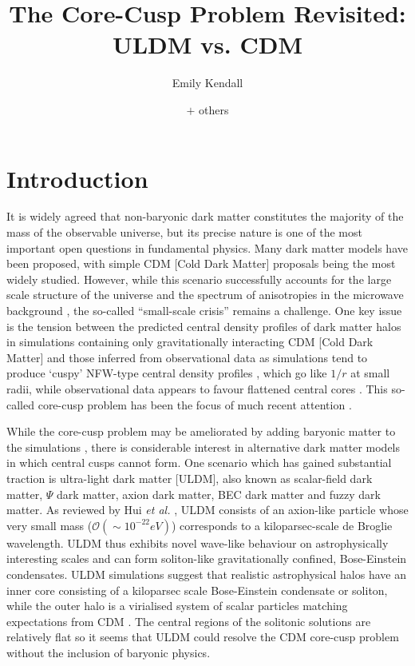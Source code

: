\documentclass[a4paper,11pt]{article}
\title{\boldmath The Core-Cusp Problem Revisited: ULDM vs. CDM}
\author[1]{Emily Kendall}
\author[1]{$+$ others}
\affiliation[1]{Department of Physics, University of Auckland, Private Bag 92019, Auckland, New Zealand}
\begin{document}
\maketitle
\flushbottom


\section{Introduction}\label{sec:intro}

It is widely agreed that non-baryonic dark matter constitutes the majority of the mass of the observable universe, but its precise nature is one of the most important open questions in fundamental physics. Many dark matter models have been proposed, with simple CDM [Cold Dark Matter] proposals being the most widely studied. However, while this scenario successfully accounts for the large scale structure of the universe \cite{Springel:2005nw} and the spectrum of anisotropies in the microwave background \cite{deBernardis:2000sbo, Hanany:2000qf, Halverson:2001yy, Netterfield:2001yq, Lee:2001yp, Ade:2015xua,  Hu:2001bc}, the so-called ``small-scale crisis'' \cite{Weinberg:2013aya} remains a challenge. One key issue is the tension between the predicted central density profiles of dark matter halos in simulations containing only gravitationally interacting CDM [Cold Dark Matter] and those inferred from observational data as simulations tend to produce `cuspy' NFW-type central density profiles \cite{Navarro:1995iw}, which go like $1/r$ at small radii, while observational data appears to favour flattened central cores \cite{Moore:1994yx} . This so-called core-cusp problem has been the focus of much recent attention \cite{Dutton:2018nop, Read:2018pft, Genina:2018}. 

While the core-cusp problem may be ameliorated by adding baryonic matter to the simulations  \cite{Benitez-Llambay:2018}, there is considerable interest in alternative dark matter models in which central cusps cannot form.  One scenario which has gained substantial traction is ultra-light dark matter [ULDM], also known as scalar-field dark matter, $\Psi$ dark matter, axion dark matter, BEC dark matter and fuzzy dark matter. As reviewed by Hui {\em et al.\/} \cite{Hui:2016ltb}, ULDM consists of an axion-like particle whose very small mass  ($\mathcal{O}(\sim 10^{-22}eV)$) corresponds to a kiloparsec-scale de Broglie wavelength.  ULDM thus exhibits novel wave-like behaviour on astrophysically interesting scales and can form soliton-like gravitationally confined, Bose-Einstein condensates. ULDM simulations suggest that realistic astrophysical halos have an inner core consisting of a kiloparsec scale Bose-Einstein condensate or soliton, while the outer halo is a virialised system of scalar particles  matching expectations from CDM \cite{Schwabe:2016rze, Veltmaat:2018dfz}. The central regions of the solitonic solutions are relatively flat so it seems that ULDM could  resolve the CDM core-cusp problem without the inclusion of baryonic physics. 
\end{document}

